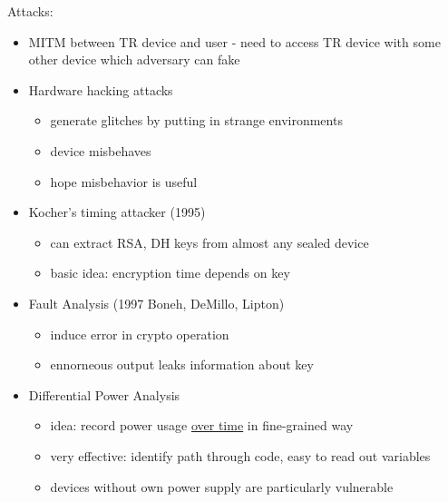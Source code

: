 Attacks:
\begin{itemize}
    \item MITM between TR device and user - need to access TR device with some
            other device which adversary can fake
    \item Hardware hacking attacks
        \begin{itemize}
            \item generate glitches by putting in strange environments
            \item device misbehaves
            \item hope misbehavior is useful
        \end{itemize}
    \item Kocher's timing attacker (1995)
        \begin{itemize}
            \item can extract RSA, DH keys from almost any sealed device
            \item basic idea: encryption time depends on key
        \end{itemize}
    \item Fault Analysis (1997 Boneh, DeMillo, Lipton)
        \begin{itemize}
            \item induce error in crypto operation
            \item ennorneous output leaks information about key
        \end{itemize}
    \item Differential Power Analysis
        \begin{itemize}
            \item idea: record power usage \underline{over time} in fine-grained
                    way
            \item very effective: identify path through code, easy to read out
                    variables
            \item devices without own power supply are particularly vulnerable
        \end{itemize}
\end{itemize}

